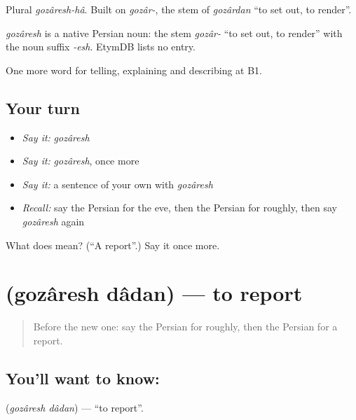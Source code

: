 Plural \emph{gozâresh-hâ}. Built on \emph{gozâr-}, the stem of \emph{gozârdan} \textquotedblleft{}to set out, to render\textquotedblright{}.

\begin{cousinweb}
\emph{gozâresh} is a native Persian noun: the stem \emph{gozâr-} \textquotedblleft{}to set out, to render\textquotedblright{} with the noun suffix \emph{-esh}. EtymDB lists no entry.
\end{cousinweb}

\begin{grammarlens}[title={What you've built}]
One more word for telling, explaining and describing at B1.
\end{grammarlens}

\subsection*{Your turn}
\begin{itemize}
\raggedright
  \item \emph{Say it:} \emph{gozâresh}
  \item \emph{Say it:} \emph{gozâresh}, once more
  \item \emph{Say it:} a sentence of your own with \emph{gozâresh}
  \item \emph{Recall:} say the Persian for the eve, then the Persian for roughly, then say \emph{gozâresh} again
\end{itemize}

\begin{tcolorbox}[breakable,colback=teal!4,colframe=teal!35!black,title={Before you move on}]
What does  mean? (\textquotedblleft{}A report\textquotedblright{}.) Say it once more.
\end{tcolorbox}
\section[\texorpdfstring{\fa{گزارش} \fa{دادن} (gozâresh dâdan)}{گزارش دادن (gozâresh dâdan)}]{  (gozâresh dâdan) — to report}

\label{lesson:FA-C308-gozaresh-dadan}



\begin{quote}
Before the new one: say the Persian for roughly, then the Persian for a report.
\end{quote}

\subsection*{You'll want to know:  }
\textbf{ } (\emph{gozâresh dâdan}) — \textquotedblleft{}to report\textquotedblright{}.

